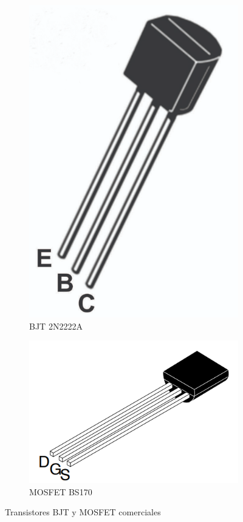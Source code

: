 \begin{figure}[h]
  \centering
  \begin{subfigure}{0.4\textwidth}
    \centering
    \includegraphics[width=0.7\linewidth]{Pictures/2N2222A_Pinout.png}
    \caption{BJT 2N2222A}
    \label{fig:subfig12N2222A}
  \end{subfigure}
  \hspace{2cm} %
  \begin{subfigure}{0.4\textwidth}
    \centering
    \includegraphics[width=0.9\linewidth]{Pictures/BS170_Pinout.png}
    \caption{MOSFET BS170}
    \label{fig:subfig2bs170}
  \end{subfigure}
  \caption{Transistores BJT y MOSFET comerciales}
  \label{fig:arduinoNanoSubfigures}
\end{figure}

